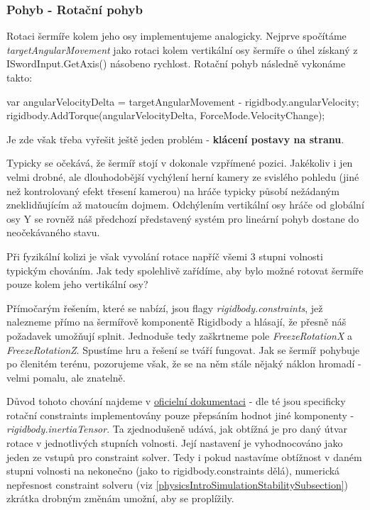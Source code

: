 \subsubsection*{Pohyb - Rotační pohyb}
Rotaci šermíře kolem jeho osy implementujeme analogicky. Nejprve spočítáme \textit{targetAngularMovement} jako rotaci kolem vertikální osy šermíře o úhel získaný z ISwordInput.GetAxis() násobeno rychlost. Rotační pohyb následně vykonáme takto:

\begin{code}
 var angularVelocityDelta = 
     targetAngularMovement - rigidbody.angularVelocity;
 rigidbody.AddTorque(angularVelocityDelta, ForceMode.VelocityChange);
\end{code}

Je zde však třeba vyřešit ještě jeden problém - \textbf{klácení postavy na stranu}. 

Typicky se očekává, že šermíř stojí v dokonale vzpřímené pozici. Jakékoliv i jen velmi drobné, ale dlouhodobější vychýlení herní kamery ze svislého pohledu (jiné než kontrolovaný efekt třesení kamerou) na hráče typicky působí nežádaným zneklidňujícím až matoucím dojmem. Odchýlením vertikální osy hráče od globální osy Y se rovněž náš předchozí představený systém pro lineární pohyb dostane do neočekávaného stavu. 

Při fyzikální kolizi je však vyvolání rotace napříč všemi 3 stupni volnosti typickým chováním. Jak tedy spolehlivě zařídíme, aby bylo možné rotovat šermíře pouze kolem jeho vertikální osy?

Přímočarým řešením, které se nabízí, jsou flagy \textit{rigidbody.constraints}, jež nalezneme přímo na šermířově komponentě Rigidbody a hlásají, že přesně náš požadavek umožňují splnit. Jednoduše tedy zaškrtneme pole \textit{FreezeRotationX} a \textit{FreezeRotationZ}. Spustíme hru a řešení se tváří fungovat. Jak se šermíř pohybuje po členitém terénu, pozorujeme však, že se na něm stále nějaký náklon hromadí - velmi pomalu, ale znatelně.

Důvod tohoto chování najdeme v \href{https://docs.unity3d.com/2022.2/Documentation/ScriptReference/Rigidbody-inertiaTensor.html}{\underline{oficielní dokumentaci}} \cite{Unity} - dle té jsou specificky rotační constraints implementovány pouze přepsáním hodnot jiné komponenty - \textit{rigidbody.inertiaTensor}. Ta zjednodušeně udává, jak obtížná je pro daný útvar rotace v jednotlivých stupních volnosti. Její nastavení je vyhodnocováno jako jeden ze vstupů pro constraint solver. Tedy i pokud nastavíme obtížnost v daném stupni volnosti na nekonečno (jako to rigidbody.constraints dělá), numerická nepřesnost constraint solveru (viz \ref{physicsIntroSimulationStabilitySubsection}) zkrátka drobným změnám umožní, aby se proplížily.

